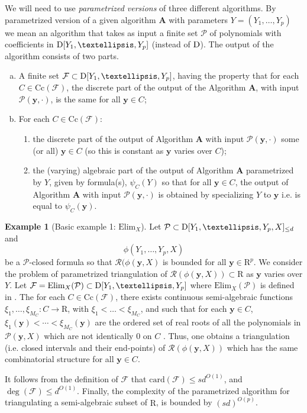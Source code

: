\documentclass{amsart}[10pts]
\theoremstyle{definition}
\newtheorem{example}{Example}[section]
\theoremstyle{remark}
\theoremstyle{observation}
\numberwithin{equation}{section}
\newcommand {\R} {\mathrm{R}}
\newcommand {\D}     {\mbox{\rm D}}
\newcommand {\RR} {{\mathcal R}}
\newcommand{\card}{\mathrm{card}}
\newcommand{\y}{\mathbf{y}}
\newcommand{\Cc}{\mathrm{Cc}}
\newcommand{\Elim}{\mathrm{Elim}}
\begin{document}
\medskip
We will need to use \emph{parametrized versions} of three different algorithms.
By parametrized version of a given algorithm $\mathbf{A}$  with parameters $Y = (Y_1,\ldots,Y_p)$ we mean an algorithm that takes as input a finite set $\mathcal{P}$ of polynomials with coefficients in $\D[Y_1,\ldots,Y_p]$ (instead of $\D$). 
The output of the algorithm consists of two parts.
\begin{enumerate}[(a)]
    \item A finite set $\mathcal{F} \subset \D[Y_1,\ldots,Y_p]$, having the property that for each $C \in \Cc(\mathcal{F})$, the discrete part of the output of the Algorithm $\mathbf{A}$, with input $\mathcal{P}(\y,\cdot)$, is the same for all $\y \in C$;
    
    \item For each $C \in \Cc(\mathcal{F})$:
        \begin{enumerate}
            \item the discrete part of the output of Algorithm $\mathbf{A}$ with input $\mathcal{P}(\y,\cdot)$ some (or all) $\y \in C$ (so this is constant as 
            $\y$ varies over $C$);
            \item the  (varying) algebraic part of the output of Algorithm $\mathbf{A}$ parametrized by $Y$, given by formula(s), $\psi_C(Y)$ so that for all $\y \in C$, the output of Algorithm $\mathbf{A}$ with input $\mathcal{P}(\y,\cdot)$ is obtained by specializing $Y$ to $\y$ i.e. is equal to $\psi_C(\y)$.    
        \end{enumerate}
\end{enumerate}

\begin{example}[Basic example 1: $\Elim_X$]
    \label{eg:Elim}
    Let $\mathcal{P} \subset \D[Y_1,\ldots,Y_p,X]_{\leq d}$ and 
    \[
    \phi(Y_1,\ldots,Y_p,X)
    \] be a $\mathcal{P}$-closed formula 
    so that
    $\RR(\phi(\y,X)$ is bounded for all $\y \in \R^p$. We consider the problem of parametrized triangulation of $\RR(\phi(\y,X)) \subset \R$ as $\y$ varies over $Y$. Let  
    $\mathcal{F} = \Elim_X(\mathcal{P}) \subset \D[Y_1,\ldots,Y_p]$
    where $\Elim_X(\mathcal{P})$ is defined in \cite[Notation 5.15]{BPRbook2}.
    The for each $C \in \Cc(\mathcal{F})$, there exists continuous semi-algebraic functions $\xi_1,\ldots,\xi_{M_C}: C \rightarrow \R$, with
    $\xi_1 < \ldots < \xi_{M_C}$, and such that for each $\y \in C$,
    $\xi_1(\y)< \cdots < \xi_{M_C}(\y)$ are the ordered set of real roots of all the polynomials in $\mathcal{P}(\y,X)$ which are not identically $0$ on $C$ \cite[Theorem 5.16]{BPRbook2}. Thus, one obtains a triangulation 
    (i.e. closed intervals and their end-points) of $\RR(\phi(\y,X))$
    which has the same combinatorial structure for all $\y \in C$.

\medskip
    It follows from the definition of $\mathcal{F}$ that
    $\card(\mathcal{F}) \leq s d^{O(1)}$, and $\deg(\mathcal{F}) \leq d^{O(1)}$. Finally, the complexity of the parametrized algorithm 
    for triangulating a semi-algebraic subset of $\R$, is bounded by 
    $(s d)^{O(p)}$.
\end{example}
\end{document}
